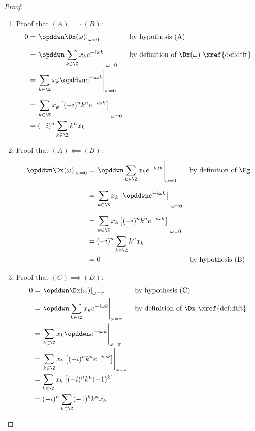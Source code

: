 \begin{proof}
\begin{enumerate}
  \item Proof that $(A)\implies(B)$: 
    \begin{align*}
      0
        &= \left.\opddwn \Dx(\omega)\right|_{\omega=0}
        && \text{by hypothesis (A)}
      \\&= \left.\opddwn \sum_{k\in\Z} x_ke^{-i\omega k} \right|_{\omega=0}
        && \text{by definition of $\Dx(\omega)$ \xref{def:dtft}}
      \\&= \left. \sum_{k\in\Z} x_k \opddwn e^{-i\omega k} \right|_{\omega=0}
      \\&= \left. \sum_{k\in\Z} x_k\left[(-i)^n k^n e^{-i\omega k}\right] \right|_{\omega=0}
      \\&= (-i)^n \sum_{k\in\Z} k^n x_k
    \end{align*}

  \item Proof that $(A)\impliedby(B)$: 
    \begin{align*}
      \left.\opddwn \Dx(\omega)\right|_{\omega=0}
        &= \left.\opddwn \sum_{k\in\Z} x_ke^{-i\omega k} \right|_{\omega=0}
        && \text{by definition of $\Fg$}
      \\&= \left. \sum_{k\in\Z} x_k\left[\opddwn e^{-i\omega k}\right] \right|_{\omega=0}
      \\&= \left. \sum_{k\in\Z} x_k\left[(-i)^n k^n e^{-i\omega k}\right] \right|_{\omega=0}
      \\&= (-i)^n \sum_{k\in\Z} k^n x_k
      \\&= 0
        && \text{by hypothesis (B)}
    \end{align*}

  \item Proof that $(C)\implies(D)$: 
    \begin{align*}
        0
          &= \left.\opddwn \Dx(\omega)\right|_{\omega=\pi}
          && \text{by hypothesis (C)}
        \\&= \left.\opddwn \sum_{k\in\Z} x_k e^{-i\omega k} \right|_{\omega=\pi}
          && \text{by definition of $\Dx$ \xref{def:dtft}}
        \\&= \left. \sum_{k\in\Z} x_k \opddwn e^{-i\omega k} \right|_{\omega=\pi}
        \\&= \left. \sum_{k\in\Z} x_k \left[(-i)^n k^n e^{-i\omega k}\right] \right|_{\omega=\pi}
        \\&= \sum_{k\in\Z} x_k \left[(-i)^n k^n (-1)^k\right]
        \\&= (-i)^n \sum_{k\in\Z} (-1)^k k^n x_k 
    \end{align*}


\end{enumerate}
\end{proof}
